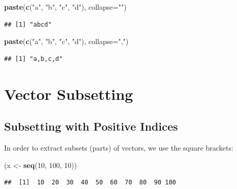 \documentclass[10pt,b5paper,krantz1]{krantz}
\newenvironment{Shaded}{\begin{snugshade}}{\end{snugshade}}
\newcommand{\DataTypeTok}[1]{\textcolor[rgb]{0.27,0.27,0.27}{#1}}
\newcommand{\DecValTok}[1]{\textcolor[rgb]{0.06,0.06,0.06}{#1}}
\newcommand{\KeywordTok}[1]{\textcolor[rgb]{0.27,0.27,0.27}{\textbf{#1}}}
\newcommand{\NormalTok}[1]{#1}
\newcommand{\StringTok}[1]{\textcolor[rgb]{0.5,0.5,0.5}{#1}}
\begin{document}
\begin{Shaded}
\begin{Highlighting}[]
\KeywordTok{paste}\NormalTok{(}\KeywordTok{c}\NormalTok{(}\StringTok{"a"}\NormalTok{, }\StringTok{"b"}\NormalTok{, }\StringTok{"c"}\NormalTok{, }\StringTok{"d"}\NormalTok{), }\DataTypeTok{collapse=}\StringTok{""}\NormalTok{)}
\end{Highlighting}
\end{Shaded}

\begin{verbatim}
## [1] "abcd"
\end{verbatim}

\begin{Shaded}
\begin{Highlighting}[]
\KeywordTok{paste}\NormalTok{(}\KeywordTok{c}\NormalTok{(}\StringTok{"a"}\NormalTok{, }\StringTok{"b"}\NormalTok{, }\StringTok{"c"}\NormalTok{, }\StringTok{"d"}\NormalTok{), }\DataTypeTok{collapse=}\StringTok{","}\NormalTok{)}
\end{Highlighting}
\end{Shaded}

\begin{verbatim}
## [1] "a,b,c,d"
\end{verbatim}

\hypertarget{vector-subsetting}{%
\section{Vector Subsetting}\label{vector-subsetting}}

\hypertarget{subsetting-with-positive-indices}{%
\subsection{Subsetting with Positive Indices}\label{subsetting-with-positive-indices}}

In order to extract subsets (parts) of vectors, we use the square brackets:

\begin{Shaded}
\begin{Highlighting}[]
\NormalTok{(x <-}\StringTok{ }\KeywordTok{seq}\NormalTok{(}\DecValTok{10}\NormalTok{, }\DecValTok{100}\NormalTok{, }\DecValTok{10}\NormalTok{))}
\end{Highlighting}
\end{Shaded}

\begin{verbatim}
##  [1]  10  20  30  40  50  60  70  80  90 100
\end{verbatim}
\end{document}
